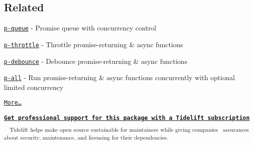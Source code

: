 \subsection*{Related}


\begin{DoxyItemize}
\item \href{https://github.com/sindresorhus/p-queue}{\tt p-\/queue} -\/ Promise queue with concurrency control
\item \href{https://github.com/sindresorhus/p-throttle}{\tt p-\/throttle} -\/ Throttle promise-\/returning \& async functions
\item \href{https://github.com/sindresorhus/p-debounce}{\tt p-\/debounce} -\/ Debounce promise-\/returning \& async functions
\item \href{https://github.com/sindresorhus/p-all}{\tt p-\/all} -\/ Run promise-\/returning \& async functions concurrently with optional limited concurrency
\item \href{https://github.com/sindresorhus/promise-fun}{\tt More…}
\end{DoxyItemize}





 {\bfseries  \href{https://tidelift.com/subscription/pkg/npm-p-limit?utm_source=npm-p-limit&utm_medium=referral&utm_campaign=readme}{\tt Get professional support for this package with a Tidelift subscription} } ~\newline
 \textsubscript{ Tidelift helps make open source sustainable for maintainers while giving companies~\newline
assurances about security, maintenance, and licensing for their dependencies. }  